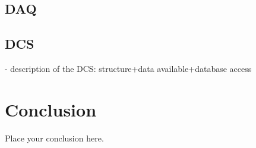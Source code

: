 \documentclass[UKenglish,texlive=2013]{\ATLASLATEXPATH atlasdoc}
\begin{document}



\subsection{DAQ}



\subsection{DCS}




- description of the DCS: structure+data available+database access




\section{Conclusion}
\label{sec:conclusion}

Place your conclusion here.

\end{document}
